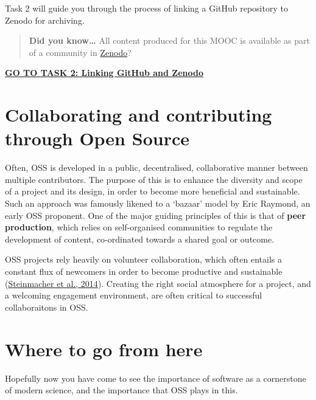 \documentclass[]{book}
\begin{document}
Task 2 will guide you through the process of linking a GitHub repository to Zenodo for archiving.

\begin{quote}
\textbf{Did you know\ldots{}} All content produced for this MOOC is available as part of a community in \href{https://zenodo.org/communities/open-science-mooc/}{Zenodo}?
\end{quote}

\textbf{\href{https://github.com/OpenScienceMOOC/Module-5-Open-Research-Software-and-Open-Source/blob/master/content_development/Task_2.md}{GO TO TASK 2: Linking GitHub and Zenodo}}

\hypertarget{collaborating-and-contributing-through-open-source}{%
\section{Collaborating and contributing through Open Source }\label{collaborating-and-contributing-through-open-source}}

Often, OSS is developed in a public, decentralised, collaborative manner between multiple contributors. The purpose of this is to enhance the diversity and scope of a project and its design, in order to become more beneficial and sustainable. Such an approach was famously likened to a `bazaar' model by Eric Raymond, an early OSS proponent. One of the major guiding principles of this is that of \textbf{peer production}, which relies on self-organised communities to regulate the development of content, co-ordinated towards a shared goal or outcome.

OSS projects rely heavily on volunteer collaboration, which often entails a constant flux of newcomers in order to become productive and sustainable (\href{https://github.com/OpenScienceMOOC/Module-5-Open-Research-Software-and-Open-Source/blob/master/Reading\%20Material_Open\%20Source\%20and\%20Open\%20Research\%20Software/Steinmacher\%20et\%20al.\%2C\%202014.pdf}{Steinmacher et al., 2014}). Creating the right social atmosphere for a project, and a welcoming engagement environment, are often critical to successful collaboraitons in OSS.

\hypertarget{where-to-go-from-here-1}{%
\section{Where to go from here }\label{where-to-go-from-here-1}}

Hopefully now you have come to see the importance of software as a cornerstone of modern science, and the importance that OSS plays in this.
\end{document}
